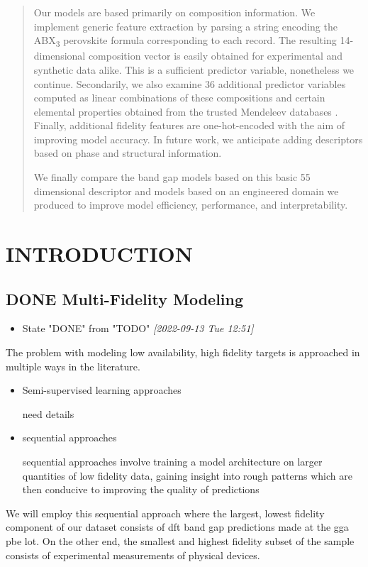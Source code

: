 \documentclass[aip, jmp, amsmath, amssymb]{revtex4-2}
\begin{document}
\begin{abstract}
Our models are based primarily on composition information. We implement generic feature extraction by parsing a string
encoding the ABX\textsubscript{3} perovskite formula corresponding to each record. The resulting 14-dimensional composition vector is
easily obtained for experimental and synthetic data alike. This is a sufficient predictor variable, nonetheless we
continue. Secondarily, we also examine 36 additional predictor variables computed as linear combinations of these
compositions and certain elemental properties obtained from the trusted Mendeleev databases \cite{mentel-2014}. Finally,
additional fidelity features are one-hot-encoded with the aim of improving model accuracy. In future work, we anticipate
adding descriptors based on phase and structural information.

We finally compare the band gap models based on this basic 55 dimensional descriptor and models based on an engineered
domain we produced to improve model efficiency, performance, and interpretability.
\end{abstract}
\section*{INTRODUCTION}
\label{sec:orgde3f46e}
\subsection*{{\bfseries\sffamily DONE} Multi-Fidelity Modeling}
\label{sec:orgf24cdea}
\begin{itemize}
\item State "DONE"       from "TODO"       \textit{[2022-09-13 Tue 12:51]}
\end{itemize}
The problem with modeling low availability, high fidelity targets is
approached in multiple ways in the literature.

\begin{itemize}
\item Semi-supervised learning approaches

need details

\item sequential approaches

sequential approaches involve training a model architecture on
larger quantities of low fidelity data, gaining insight into rough
patterns which are then conducive to improving the quality of
predictions
\end{itemize}

We will employ this sequential approach where the largest, lowest
fidelity component of our dataset consists of \acrfull{dft} band gap predictions made at the \acrfull{gga} \acrfull{pbe} \gls{lot}. On
the other end, the smallest and highest fidelity subset of the sample
consists of experimental measurements of physical devices.
\end{document}
